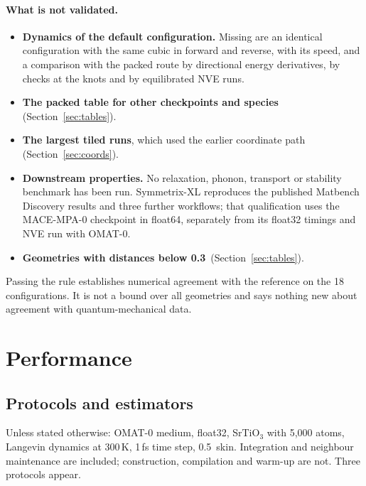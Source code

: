 \documentclass[11pt]{article}
\newcommand{\angstrom}{\text{\AA}}
\begin{document}
\paragraph{What is not validated.}
\begin{itemize}\setlength{\itemsep}{0.1em}
\item \textbf{Dynamics of the default configuration.} Missing are an identical configuration with the same cubic
      in forward and reverse, with its speed, and a comparison with the packed route by directional energy
      derivatives, by checks at the knots and by equilibrated NVE runs.
\item \textbf{The packed table for other checkpoints and species} (Section~\ref{sec:tables}).
\item \textbf{The largest tiled runs}, which used the earlier coordinate path (Section~\ref{sec:coords}).
\item \textbf{Downstream properties.} No relaxation, phonon, transport or stability benchmark has been run.
      Symmetrix-XL reproduces the published Matbench Discovery results \cite{riebesell2025matbench} and three
      further workflows; that qualification uses the MACE-MPA-0 checkpoint in float64, separately from its
      float32 timings and NVE run with OMAT-0.
\item \textbf{Geometries with distances below 0.3\,\angstrom} (Section~\ref{sec:tables}).
\end{itemize}
Passing the rule establishes numerical agreement with the reference on the 18 configurations. It is not a bound
over all geometries and says nothing new about agreement with quantum-mechanical data.

\section{Performance}
\label{sec:performance}

\subsection{Protocols and estimators}
\label{sec:protocols}

Unless stated otherwise: OMAT-0 medium, float32, SrTiO$_3$ with 5{,}000 atoms, Langevin dynamics at 300\,K, 1\,fs
time step, 0.5\,\angstrom{} skin. Integration and neighbour maintenance are included; construction, compilation
and warm-up are not. Three protocols appear.
\end{document}
